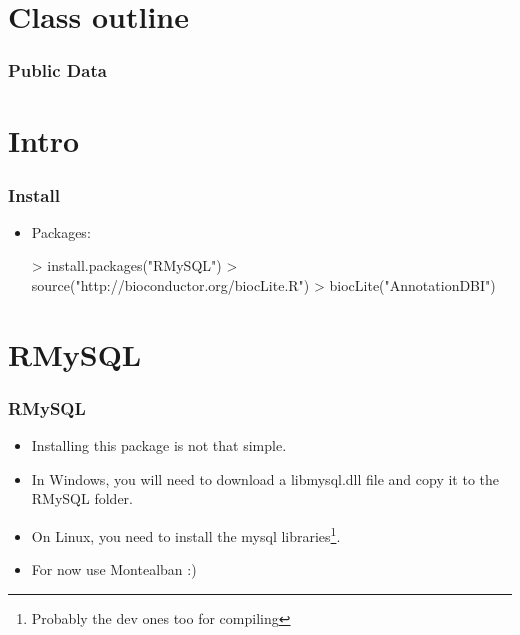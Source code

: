 




\usepackage{Sweave}


\begin{frame}[allowframebreaks]
  \titlepage
\end{frame}

\section*{Class outline}

\begin{frame}[allowframebreaks]
  \frametitle{Public Data}
  \tableofcontents[hideallsubsections]
\end{frame}

\section{Intro}

\begin{frame}
  \frametitle{Install}
  \begin{itemize}
  \item Packages:
\begin{Schunk}
\begin{Sinput}
> install.packages("RMySQL")
> source("http://bioconductor.org/biocLite.R")
> biocLite("AnnotationDBI")
\end{Sinput}
\end{Schunk}
  \end{itemize}
\end{frame}

\section{RMySQL}

\begin{frame}[allowframebreaks]
  \frametitle{RMySQL}
  \begin{itemize}
  \item Installing this package is not that simple. 
  \item In Windows, you will need to download a libmysql.dll file and copy it to the RMySQL folder.
  \item On Linux, you need to install the mysql libraries\footnote{Probably the dev ones too for compiling}.
  \item For now use Montealban :)
  \end{itemize}
\end{frame}

